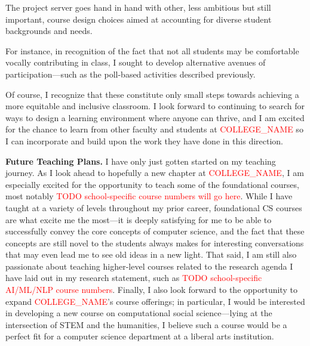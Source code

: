 \documentclass[11pt,letterpaper]{article}
\renewcommand{\section}[1]{\vspace{0.25\baselineskip}\noindent\textbf{#1.}}
\newcommand{\schoolname}{\textcolor{red}{COLLEGE\_NAME}\xspace} %
\newif\iflongdei
\begin{document}
The project server goes hand in hand with other, less ambitious but still important, course design choices aimed at accounting for diverse student backgrounds and needs.
\iflongdei
I discuss these in more detail in my statement on diversity, equity, and inclusion.
\else
For instance, in recognition of the fact that not all students may be comfortable vocally contributing in class, I sought to develop alternative avenues of participation---such as the poll-based activities described previously.
\fi
Of course, I recognize that these constitute only small steps towards achieving a more equitable and inclusive classroom.
I look forward to continuing to search for ways to design a learning environment where anyone can thrive, and I am excited for the chance to learn from other faculty and students at \schoolname so I can incorporate and build upon the work they have done in this direction.

\section{Future Teaching Plans}
I have only just gotten started on my teaching journey.
As I look ahead to hopefully a new chapter at \schoolname, I am especially excited for the opportunity to teach some of the foundational courses, most notably \textcolor{red}{TODO school-specific course numbers will go here}.
While I have taught at a variety of levels throughout my prior career, foundational CS courses are what excite me the most---it is deeply satisfying for me to be able to successfully convey the core concepts of computer science, and the fact that these concepts are still novel to the students always makes for interesting conversations that may even lead me to see old ideas in a new light.
That said, I am still also passionate about teaching higher-level courses related to the research agenda I have laid out in my research statement, such as \textcolor{red}{TODO school-specific AI/ML/NLP course numbers}.
Finally, I also look forward to the opportunity to expand \schoolname's course offerings; in particular, I would be interested in developing a new course on computational social science---lying at the intersection of STEM and the humanities, I believe such a course would be a perfect fit for a computer science department at a liberal arts institution.
\end{document}
